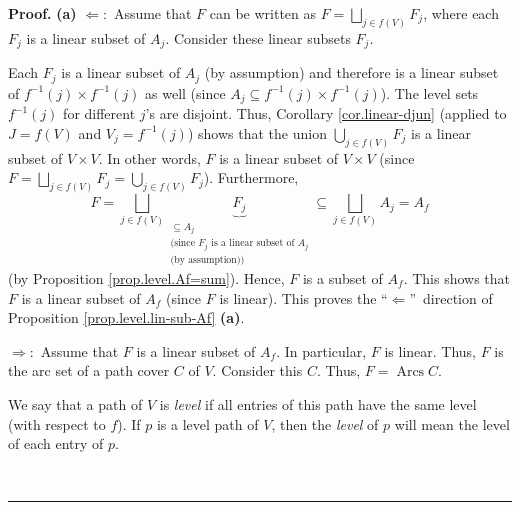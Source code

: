 \documentclass[numbers=enddot,12pt,final,onecolumn,notitlepage]{scrartcl}%
\numberwithin{exer}{section}
\theoremstyle{definition}
\newenvironment{proof}[1][Proof]{\noindent\textbf{#1.} }{\ \rule{0.5em}{0.5em}}
\let\cupnonlimits\bigcup
\let\sqcupnonlimits\bigsqcup
\renewcommand{\bigcup}{\cupnonlimits\limits}
\renewcommand{\bigsqcup}{\sqcupnonlimits\limits}
\newenvironment{verlong}{}{}
\begin{document}
\begin{verlong}


\begin{proof}
\textbf{(a)} $\Longleftarrow:$ Assume that $F$ can be written as
$F=\bigsqcup_{j\in f\left(  V\right)  }F_{j}$, where each $F_{j}$ is a linear
subset of $A_{j}$. Consider these linear subsets $F_{j}$.

Each $F_{j}$ is a linear subset of $A_{j}$ (by assumption) and therefore is a
linear subset of $f^{-1}\left(  j\right)  \times f^{-1}\left(  j\right)  $ as
well (since $A_{j}\subseteq f^{-1}\left(  j\right)  \times f^{-1}\left(
j\right)  $). The level sets $f^{-1}\left(  j\right)  $ for different $j$'s
are disjoint. Thus, Corollary \ref{cor.linear-djun} (applied to $J=f\left(
V\right)  $ and $V_{j}=f^{-1}\left(  j\right)  $) shows that the union
$\bigcup_{j\in f\left(  V\right)  }F_{j}$ is a linear subset of $V\times V$.
In other words, $F$ is a linear subset of $V\times V$ (since $F=\bigsqcup
_{j\in f\left(  V\right)  }F_{j}=\bigcup_{j\in f\left(  V\right)  }F_{j}$).
Furthermore,%
\[
F=\bigsqcup_{j\in f\left(  V\right)  }\underbrace{F_{j}}_{\substack{\subseteq
A_{j}\\\text{(since }F_{j}\text{ is a linear subset of }A_{j}\\\text{(by
assumption))}}}\subseteq\bigsqcup_{j\in f\left(  V\right)  }A_{j}=A_{f}%
\]
(by Proposition \ref{prop.level.Af=sum}). Hence, $F$ is a subset of $A_{f}$.
This shows that $F$ is a linear subset of $A_{f}$ (since $F$ is linear). This
proves the \textquotedblleft$\Longleftarrow$\textquotedblright\ direction of
Proposition \ref{prop.level.lin-sub-Af} \textbf{(a)}.

$\Longrightarrow:$ Assume that $F$ is a linear subset of $A_{f}$. In
particular, $F$ is linear. Thus, $F$ is the arc set of a path cover $C$ of
$V$. Consider this $C$. Thus, $F=\operatorname*{Arcs}C$.

We say that a path of $V$ is \emph{level} if all entries of this path have the
same level (with respect to $f$). If $p$ is a level path of $V$, then the
\emph{level} of $p$ will mean the level of each entry of $p$.


\end{proof}
\end{verlong}
\end{document}
